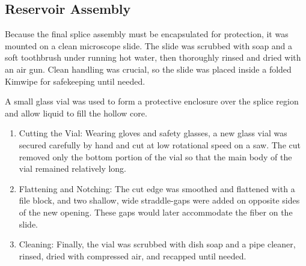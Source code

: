 \subsection{Reservoir Assembly}
\label{Cooling:Appendix:subsec:Reservoir Assembly}

Because the final splice assembly must be encapsulated for protection, it was mounted on a clean microscope slide. The slide was scrubbed with soap and a soft toothbrush under running hot water, then thoroughly rinsed and dried with an air gun. Clean handling was crucial, so the slide was placed inside a folded Kimwipe for safekeeping until needed.

A small glass vial was used to form a protective enclosure over the splice region and allow liquid to fill the hollow core.

\begin{enumerate}
	\item Cutting the Vial: Wearing gloves and safety glasses, a new glass vial was secured carefully by hand and cut at low rotational speed on a saw. The cut removed only the bottom portion of the vial so that the main body of the vial remained relatively long.
	\item Flattening and Notching: The cut edge was smoothed and flattened with a file block, and two shallow, wide straddle-gaps were added on opposite sides of the new opening. These gaps would later accommodate the fiber on the slide.
	\item Cleaning: Finally, the vial was scrubbed with dish soap and a pipe cleaner, rinsed, dried with compressed air, and recapped until needed.
\end{enumerate}

